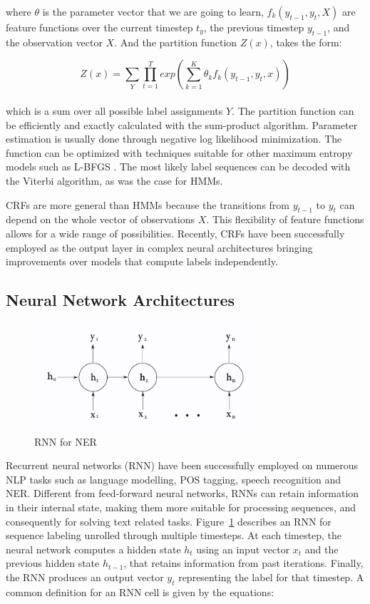 \documentclass{nle}
\begin{document}
where $ \theta $ is the parameter vector that we are going to learn, $ f_k(y_{t-1}, y_{t}, X) $ 
are feature functions over the current timestep $ t_y $, the previous timestep $ y_{t-1}$, 
and the observation vector $ X $. And the partition function $ Z(x) $, takes the form:

\begin{equation}
Z(x) = \sum_{Y} \prod_{t=1}^{T} exp \left( \sum_{k=1}^{K} \theta_k f_k(y_{t-1}, y_t, x) \right)
\end{equation}
\\

which is a sum over all possible label assignments $ Y $. The partition function can be efficiently
and exactly calculated with the sum-product algorithm. Parameter estimation is usually done through 
negative log likelihood minimization. The function can be optimized with techniques suitable for other 
maximum entropy models such as L-BFGS \cite{Liu1989}. The most likely label sequences can be decoded 
with the Viterbi algorithm, as was the case for HMMs.

CRFs are more general than HMMs because the transitions from $ y_{t-1} $ to $ y_{t} $ can depend 
on the whole vector of observations $ X $. This flexibility of feature functions allows for a wide range of
possibilities. Recently, CRFs have been successfully employed as the output layer in complex neural 
architectures bringing improvements over models that compute labels independently.

\subsection{Neural Network Architectures}

\begin{figure}
  \centering
  \includegraphics[width=0.75\textwidth]{pics/rnn_network}
  \caption{RNN for NER}
  \label{fig:rnn_network}
\end{figure}

Recurrent neural networks (RNN) have been successfully employed on numerous NLP tasks such as
language modelling, POS tagging, speech recognition and NER. Different from feed-forward 
neural networks, RNNs can retain information in their internal state, making them more 
suitable for processing sequences, and consequently for solving text related tasks. 
Figure~\ref{fig:rnn_network} describes an RNN for sequence labeling unrolled through multiple 
timesteps. At each timestep, the neural network computes a hidden state $ h_t $ using an input 
vector $ x_t $ and the previous hidden state $ h_{t-1} $, that retains information from past 
iterations. Finally, the RNN produces an output vector $ y_t $ representing the label for that 
timestep. A common definition for an RNN cell is given by the equations:
\end{document}
